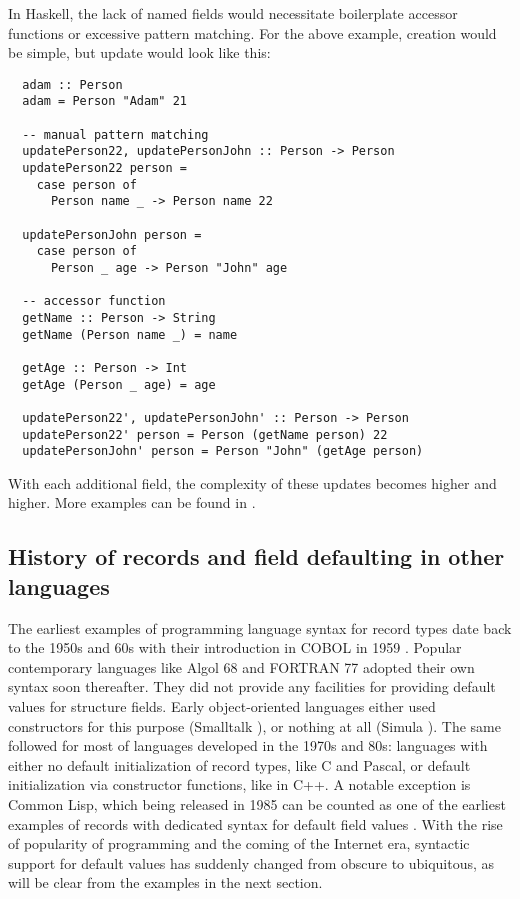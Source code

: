 \documentclass[en]{pracamgr}
\begin{document}
In Haskell, the lack of named fields would necessitate boilerplate accessor functions or excessive pattern matching.
For the above example, creation would be simple, but update would look like this:
\begin{lstlisting}
  adam :: Person
  adam = Person "Adam" 21

  -- manual pattern matching
  updatePerson22, updatePersonJohn :: Person -> Person
  updatePerson22 person = 
    case person of
      Person name _ -> Person name 22

  updatePersonJohn person = 
    case person of
      Person _ age -> Person "John" age

  -- accessor function
  getName :: Person -> String
  getName (Person name _) = name
  
  getAge :: Person -> Int
  getAge (Person _ age) = age

  updatePerson22', updatePersonJohn' :: Person -> Person
  updatePerson22' person = Person (getName person) 22
  updatePersonJohn' person = Person "John" (getAge person)

\end{lstlisting}
With each additional field, the complexity of these updates becomes higher and higher.
More examples can be found in \cite{WikibooksHaskellDatatypes}.
\subsection{History of records and field defaulting in other languages}
The earliest examples of programming language syntax for record types date back to the 1950s and 60s with their introduction in COBOL in 1959 \cite{sebesta1996concepts}.
Popular contemporary languages like Algol 68 \cite{van2012revised} and FORTRAN 77 \cite{fortran77} adopted their own syntax soon thereafter.
They did not provide any facilities for providing default values for structure fields.
Early object-oriented languages either used constructors for this purpose (Smalltalk \cite{smalltalk80}), or nothing at all (Simula \cite{Simula67}).
The same followed for most of languages developed in the 1970s and 80s: languages with either no default initialization of record types, like C and Pascal,
or default initialization via constructor functions, like in C++.
A notable exception is Common Lisp, which being released in 1985 can be counted 
as one of the earliest examples of records with dedicated syntax for default field values \cite{CommonLisp}.
With the rise of popularity of programming and the coming of the Internet era, 
syntactic support for default values has suddenly changed from obscure to ubiquitous, as will be clear from the examples in the next section.
\end{document}
